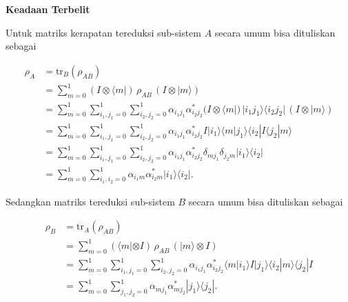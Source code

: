 \textbf{Keadaan Terbelit}
\par
Untuk matriks kerapatan tereduksi sub-sistem $A$ secara umum bisa dituliskan sebagai

\begin{align}
\rho_A &= \mathrm{tr}_B(\rho_{AB}) \nonumber \\
&= \sum_{m=0}^{1} (I \otimes \langle m|)\, \rho_{AB}\, (I \otimes |m\rangle) \nonumber \\
&= \sum_{m=0}^{1} \sum_{i_1,j_1=0}^{1} \sum_{i_2,j_2=0}^{1}
\alpha_{i_1 j_1}\alpha^{*}_{i_2 j_2}
(I \otimes \langle m|)\, |i_1 j_1\rangle \langle i_2 j_2|\, (I \otimes |m\rangle) \nonumber \\
&= \sum_{m=0}^{1} \sum_{i_1,j_1=0}^{1} \sum_{i_2,j_2=0}^{1}
\alpha_{i_1 j_1}\alpha^{*}_{i_2 j_2}
I |i_1\rangle \langle m|j_1\rangle \langle i_2| I \langle j_2|m\rangle \nonumber \\
&= \sum_{m=0}^{1} \sum_{i_1,j_1=0}^{1} \sum_{i_2,j_2=0}^{1}
\alpha_{i_1 j_1}\alpha^{*}_{i_2 j_2}
\delta_{m j_1}\delta_{j_2 m} |i_1\rangle \langle i_2| \nonumber \\
&= \sum_{m=0}^{1} \sum_{i_1,i_2=0}^{1}
\alpha_{i_1 m}\alpha^{*}_{i_2 m}
|i_1\rangle \langle i_2|\label{rhoA2qubit} .
\end{align}

Sedangkan matriks tereduksi sub-sistem $B$ secara umum bisa dituliskan sebagai

\begin{align}
\rho_B &= \mathrm{tr}_A(\rho_{AB}) \nonumber \\
&= \sum_{m=0}^{1} (\langle m| \otimes I)\, \rho_{AB}\, (|m\rangle \otimes I) \nonumber \\
&= \sum_{m=0}^{1} \sum_{i_1,j_1=0}^{1} \sum_{i_2,j_2=0}^{1}
\alpha_{i_1 j_1}\alpha^{*}_{i_2 j_2}
\langle m|i_1\rangle I |j_1\rangle \langle i_2|m\rangle \langle j_2| I \nonumber \\
&= \sum_{m=0}^{1} \sum_{j_1,j_2=0}^{1}
\alpha_{m j_1}\alpha^{*}_{m j_2}
|j_1\rangle \langle j_2|\label{rhoB2qubit} .
\end{align}



